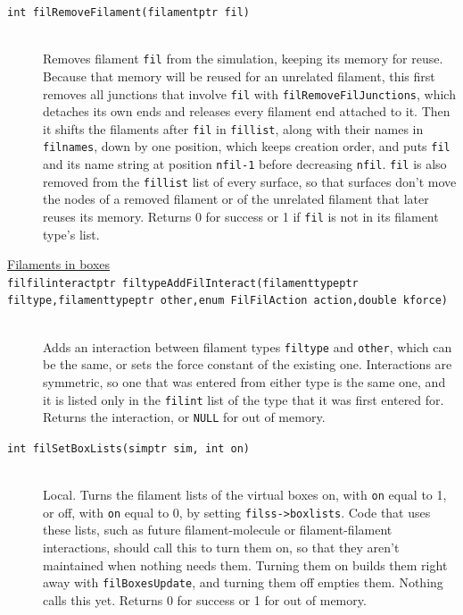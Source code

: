 \documentclass {scrbook}
\newcommand {\ttt} {\texttt}
\begin{document}
\begin{description}
\item[\ttt{int filRemoveFilament(filamentptr fil)}] %
\hfill \\
Removes filament \ttt{fil} from the simulation, keeping its memory for reuse. Because that memory will be reused for an unrelated filament, this first removes all junctions that involve \ttt{fil} with \ttt{filRemoveFilJunctions}, which detaches its own ends and releases every filament end attached to it. Then it shifts the filaments after \ttt{fil} in \ttt{fillist}, along with their names in \ttt{filnames}, down by one position, which keeps creation order, and puts \ttt{fil} and its name string at position \ttt{nfil-1} before decreasing \ttt{nfil}. \ttt{fil} is also removed from the \ttt{fillist} list of every surface, so that surfaces don't move the nodes of a removed filament or of the unrelated filament that later reuses its memory. Returns 0 for success or 1 if \ttt{fil} is not in its filament type's list.


\item[\underline{Filaments in boxes}]

\item[\ttt{filfilinteractptr filtypeAddFilInteract(filamenttypeptr filtype,filamenttypeptr other,enum FilFilAction action,double kforce)}] %
\hfill \\
Adds an interaction between filament types \ttt{filtype} and \ttt{other}, which can be the same, or sets the force constant of the existing one. Interactions are symmetric, so one that was entered from either type is the same one, and it is listed only in the \ttt{filint} list of the type that it was first entered for. Returns the interaction, or \ttt{NULL} for out of memory.

\item[\ttt{int filSetBoxLists(simptr sim, int on)}] %
\hfill \\
Local. Turns the filament lists of the virtual boxes on, with \ttt{on} equal to 1, or off, with \ttt{on} equal to 0, by setting \ttt{filss->boxlists}. Code that uses these lists, such as future filament-molecule or filament-filament interactions, should call this to turn them on, so that they aren't maintained when nothing needs them. Turning them on builds them right away with \ttt{filBoxesUpdate}, and turning them off empties them. Nothing calls this yet. Returns 0 for success or 1 for out of memory.


\end{description}
\end{document}
